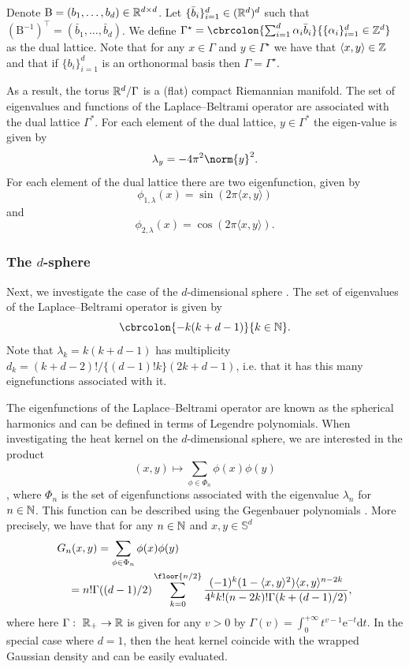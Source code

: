 Denote \(\mathrm{B} = (b_1, \dots, b_d) \in \mathbb{R}^{d \times d}\).
Let \(\{\bar{b}_i\}_{i=1}^d \in (\mathbb{R}^d)^d\) such that \((\mathrm{B}^{-1})^\top = (\bar{b}_1, \dots, \bar{b}_d)\).
We define \(\Gamma^\star = \cbrcolon{\sum_{i=1}^d \alpha_i \bar{b}_i}{\{\alpha_i\}_{i=1}^d \in \Z^d}\) as the dual lattice.
Note that for any \(x \in \Gamma\) and \(y \in \Gamma^\star\) we have that \(\langle x, y \rangle \in \mathbb{Z}\) and that if \(\{b_i\}_{i=1}^d\) is an orthonormal basis then \(\Gamma = \Gamma^\star\).

As a result, the torus \(\mathbb{R}^d/\Gamma\) is a (flat) compact Riemannian manifold.
The set of eigenvalues and functions of the Laplace--Beltrami operator are associated with the dual lattice \(\Gamma^*\).
For each element of the dual lattice, \(y\in \Gamma^*\) the eigen-value is given by \[ \lambda_y = -4 \pi^2 \norm{y}^2.\]
For each element of the dual lattice there are two eigenfunction, given by \[\phi_{1, \lambda}(x) = \sin(2 \pi \langle x, y \rangle)\] and \[\phi_{2, \lambda}(x) =  \cos(2 \pi \langle x, y \rangle).\]

\subsubsection{The \(d\)-sphere}
Next, we investigate the case of the \(d\)-dimensional sphere \parencite[see][]{saloff1994precise}.
The set of eigenvalues of the Laplace--Beltrami operator is given by \[\cbrcolon{-k(k+d-1)}{k \in \N}.\]
Note that \(\lambda_k = k(k+d-1)\) has multiplicity 
\(d_k = (k+d-2)!/\{(d-1)!k\}(2k+d-1)\), i.e. that it has this many eignefunctions associated with it.

The eigenfunctions of the Laplace--Beltrami operator are known as the spherical harmonics and can be defined in terms of Legendre polynomials.
When investigating the heat kernel on the \(d\)-dimensional sphere, we are interested in the product \[(x,y) \mapsto \sum_{\phi \in \Phi_n} \phi(x)\phi(y)\], where \(\Phi_n\) is the set of eigenfunctions associated with the eigenvalue \(\lambda_n\) for \(n \in \mathbb{N}\).
This function can be described using the Gegenbauer polynomials \cite[see][Theorem 2.9]{atkinson2012spherical}.
More precisely, we have that for any \(n \in \mathbb{N}\) and \(x,y \in \mathbb{S}^d\) \begin{align}  & G_n(x,y) = { \sum_{\phi \in \Phi_n} \phi(x) \phi(y)} \\  & \quad = n!
                 \Gamma((d-1)/2) \sum_{k=0}^{\floor{n/2}} \frac{(-1)^k (1- \langle x,y \rangle^2)\langle x,y \rangle^{n-2k}}{4^k k! (n -2k)! \Gamma(k + (d-1)/2)},
\end{align}
where here \(\Gamma: \ \R_+ \to \R\) is given for any \(v > 0\) by
\(\Gamma(v) = \int_0^{+\infty} t^{v-1} \mathrm{e}^{-t} \mathrm{d} t\).
In the special case where \(d=1\), then the heat kernel coincide with the wrapped Gaussian density and can be easily evaluated.